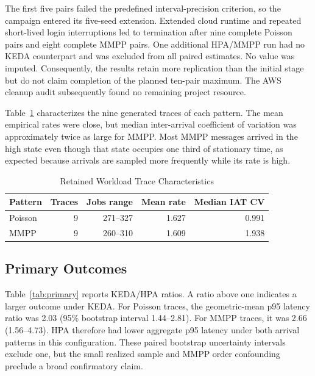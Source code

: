 \documentclass[conference]{IEEEtran}
\begin{document}
The first five pairs failed the predefined interval-precision criterion, so the
campaign entered its five-seed extension. Extended cloud runtime and repeated
short-lived login interruptions led to termination after nine complete Poisson
pairs and eight complete MMPP pairs. One additional HPA/MMPP run had no KEDA
counterpart and was excluded from all paired estimates. No value was imputed.
Consequently, the results retain more replication than the initial stage but do
not claim completion of the planned ten-pair maximum. The AWS cleanup audit
subsequently found no remaining project resource.

Table~\ref{tab:traces} characterizes the nine generated traces of each pattern.
The mean empirical rates were close, but median inter-arrival coefficient of
variation was approximately twice as large for MMPP. Most MMPP messages arrived
in the high state even though that state occupies one third of stationary time,
as expected because arrivals are sampled more frequently while its rate is high.

\begin{table}[t]
  \caption{Retained Workload Trace Characteristics}
  \label{tab:traces}
  \centering
  \begin{tabular}{lrrrr}
    \toprule
    Pattern & Traces & Jobs range & Mean rate & Median IAT CV \\
    \midrule
    Poisson & 9 & 271--327 & 1.627 & 0.991 \\
    MMPP & 9 & 260--310 & 1.609 & 1.938 \\
    \bottomrule
  \end{tabular}
\end{table}

\subsection{Primary Outcomes}

Table~\ref{tab:primary} reports KEDA/HPA ratios. A ratio above one indicates a
larger outcome under KEDA. For Poisson traces, the geometric-mean p95 latency
ratio was 2.03 (95\% bootstrap interval 1.44--2.81). For MMPP traces, it was
2.66 (1.56--4.73). HPA therefore had lower aggregate p95 latency under both
arrival patterns in this configuration. These paired bootstrap uncertainty
intervals exclude one, but the small realized sample and MMPP order confounding
preclude a broad confirmatory claim.
\end{document}
